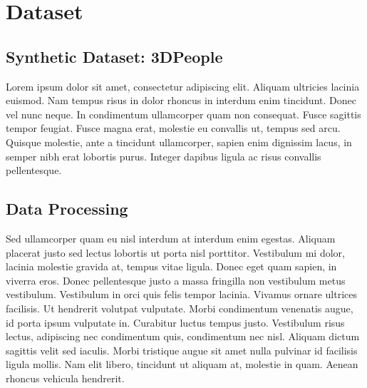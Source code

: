 

\chapter{Dataset} %

\label{Synthetic Dataset} %



\section{Synthetic Dataset: 3DPeople}

Lorem ipsum dolor sit amet, consectetur adipiscing elit. Aliquam ultricies lacinia euismod. Nam tempus risus in dolor
rhoncus in interdum enim tincidunt. Donec vel nunc neque. In condimentum ullamcorper quam non consequat. Fusce
sagittis tempor feugiat. Fusce magna erat, molestie eu convallis ut, tempus sed arcu. Quisque molestie, ante a
tincidunt ullamcorper, sapien enim dignissim lacus, in semper nibh erat lobortis purus. Integer dapibus ligula ac
risus convallis pellentesque.




\section{Data Processing}

Sed ullamcorper quam eu nisl interdum at interdum enim egestas. Aliquam placerat justo sed lectus lobortis ut porta
nisl porttitor. Vestibulum mi dolor, lacinia molestie gravida at, tempus vitae ligula. Donec eget quam sapien, in
viverra eros. Donec pellentesque justo a massa fringilla non vestibulum metus vestibulum. Vestibulum in orci quis
felis tempor lacinia. Vivamus ornare ultrices facilisis. Ut hendrerit volutpat vulputate. Morbi condimentum venenatis
augue, id porta ipsum vulputate in. Curabitur luctus tempus justo. Vestibulum risus lectus, adipiscing nec
condimentum quis, condimentum nec nisl. Aliquam dictum sagittis velit sed iaculis. Morbi tristique augue sit amet
nulla pulvinar id facilisis ligula mollis. Nam elit libero, tincidunt ut aliquam at, molestie in quam. Aenean rhoncus
vehicula hendrerit.
